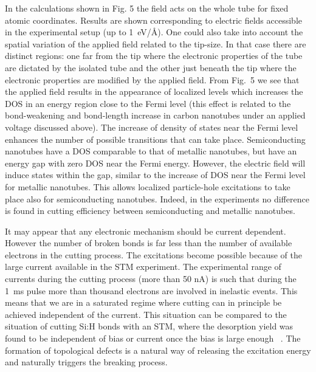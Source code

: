 \begin{multicols}{2}
In the calculations shown in Fig. 5 the field acts on the whole
tube for fixed atomic coordinates. Results are shown corresponding
to electric fields accessible in the experimental setup (up to
1~eV/\AA). One could also take into account the spatial variation
of the applied field related to the tip-size. In that case there
are distinct regions: one far from the tip where the electronic
properties of the tube are dictated by the isolated tube and the
other just beneath the tip where the electronic properties are
modified by the applied field. From Fig.~5 we see that the applied
field results in the appearance of localized levels which
increases the DOS in an energy region close to the Fermi level
(this effect is related to the bond-weakening and bond-length
increase in carbon nanotubes under an applied voltage discussed
above). The increase of density of states near the Fermi level
enhances the number of possible transitions that can take place.
Semiconducting nanotubes have a DOS comparable to that of metallic
nanotubes, but have an energy gap with zero DOS near the Fermi
energy. However, the electric field will induce states within the
gap, similar to the increase of DOS near the Fermi level for
metallic nanotubes. This allows localized particle-hole
excitations to take place also for semiconducting nanotubes.
Indeed, in the experiments no difference is found in cutting
efficiency between semiconducting and metallic nanotubes.

It may appear that any electronic mechanism should be current
dependent. However the number of broken bonds is far less than the
number of available electrons in the cutting process. The
excitations become possible because of the large current available
in the STM experiment. The experimental range of currents during
the cutting process (more than 50 nA) is such that during the 1~ms
pulse more than thousand electrons are involved in inelastic
events. This means that we are in a saturated regime where cutting
can in principle be achieved independent of the current. This
situation can be compared to the situation of cutting Si:H bonds
with an STM, where the desorption yield was found to be
independent of bias or current once the bias is large enough~
\cite{petern}. The formation of topological defects is a natural
way of releasing the excitation energy and naturally triggers the
breaking process.




\end{multicols}
